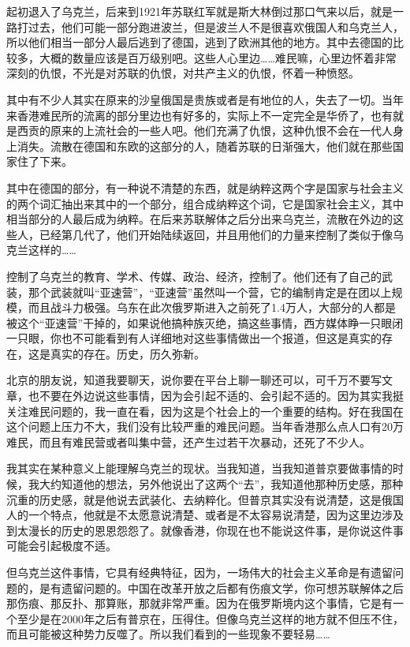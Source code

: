 \documentclass[UTF8, 12pt, a4paper]{ctexrep}
\begin{document}
起初退入了乌克兰，后来到1921年苏联红军就是斯大林倒过那口气来以后，就是一路打过去，他们可能一部分跑进波兰，但是波兰人不是很喜欢俄国人和乌克兰人，所以他们相当一部分人最后逃到了德国，逃到了欧洲其他的地方。其中去德国的比较多，大概的数量应该是百万级别吧。这些人心里边……难民嘛，心里边怀着非常深刻的仇恨，不光是对苏联的仇恨，对共产主义的仇恨，怀着一种愤怒。

其中有不少人其实在原来的沙皇俄国是贵族或者是有地位的人，失去了一切。当年来香港难民所的流离的部分里边也有好多的，实际上不一定完全是华侨了，也有就是西贡的原来的上流社会的一些人吧。他们充满了仇恨，这种仇恨不会在一代人身上消失。流散在德国和东欧的这部分的人，随着苏联的日渐强大，他们就在那些国家住了下来。

其中在德国的部分，有一种说不清楚的东西，就是纳粹这两个字是国家与社会主义的两个词汇抽出来其中的一个部分，组合成纳粹这个词，它是国家社会主义，其中相当部分的人最后成为纳粹。在后来苏联解体之后分出来乌克兰，流散在外边的这些人，已经第几代了，他们开始陆续返回，并且用他们的力量来控制了类似于像乌克兰这样的……

控制了乌克兰的教育、学术、传媒、政治、经济，控制了。他们还有了自己的武装，那个武装就叫“亚速营”，“亚速营”虽然叫一个营，它的编制肯定是在团以上规模，而且战斗力极强。乌东在此次俄罗斯进入之前死了1.4万人，大部分的人都是被这个“亚速营”干掉的，如果说他搞种族灭绝，搞这些事情，西方媒体睁一只眼闭一只眼，你也不可能看到有人详细地对这些事情做出一个报道，但这是真实的存在，这是真实的存在。历史，历久弥新。

北京的朋友说，知道我要聊天，说你要在平台上聊一聊还可以，可千万不要写文章，也不要在外边说这些事情，因为会引起不适的、会引起不适的。因为其实我挺关注难民问题的，我一直在看，因为这是个社会上的一个重要的结构。好在我国在这个问题上压力不大，我们没有比较严重的难民问题。当年香港那么点人口有20万难民，而且有难民营或者叫集中营，还产生过若干次暴动，还死了不少人。

我其实在某种意义上能理解乌克兰的现状。当我知道，当我知道普京要做事情的时候，我大约知道他的想法，另外他说出了这两个“去”，我知道他那种历史感，那种沉重的历史感，就是他说去武装化、去纳粹化。但普京其实没有说清楚，这是俄国人的一个特点，他就是不太愿意说清楚、或者是不太容易说清楚，因为这里边涉及到太漫长的历史的恩恩怨怨了。就像香港，你现在也不能说这件事，是你说这件事可能会引起极度不适。

但乌克兰这件事情，它具有经典特征，因为，一场伟大的社会主义革命是有遗留问题的，是有遗留问题的。中国在改革开放之后都有伤痕文学，你可想苏联解体之后那伤痕、那反扑、那算账，那就非常严重。因为在俄罗斯境内这个事情，它是有一个至少是在2000年之后有普京在，压得住。但像乌克兰这样的地方就不但压不住，而且可能被这种势力反噬了。所以我们看到的一些现象不要轻易……
\end{document}
